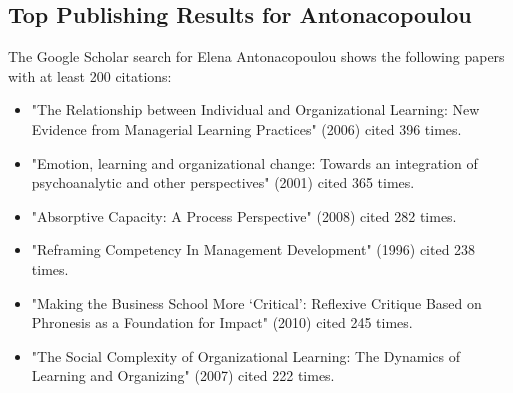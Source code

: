 \subsection{Top Publishing Results for Antonacopoulou}
The Google Scholar search for Elena Antonacopoulou shows the following papers with at least 200 citations:\\
\begin{itemize}
\item "The Relationship between Individual and Organizational Learning: New Evidence from Managerial Learning Practices" (2006) cited 396 times.
\item "Emotion, learning and organizational change: Towards an integration of psychoanalytic and other perspectives" (2001) cited 365 times.
\item "Absorptive Capacity: A Process Perspective" (2008) cited 282 times.
\item "Reframing Competency In Management Development" (1996) cited 238 times.
\item "Making the Business School More ‘Critical’: Reflexive Critique Based on Phronesis as a Foundation for Impact" (2010) cited 245 times.
\item "The Social Complexity of Organizational Learning: The Dynamics of Learning and Organizing" (2007) cited 222 times.
\end{itemize}



